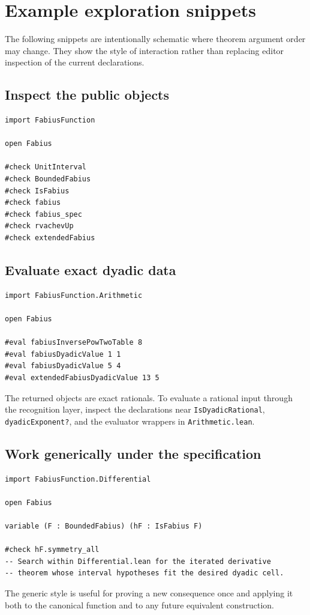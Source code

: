 \documentclass[11pt,oneside]{article}
\theoremstyle{definition}
\theoremstyle{remark}
\begin{document}
\section{Example exploration snippets}\label{app:snippets}

The following snippets are intentionally schematic where theorem argument order may change.  They show the style of interaction rather than replacing editor inspection of the current declarations.

\subsection{Inspect the public objects}
\begin{lstlisting}[style=pseudo]
import FabiusFunction

open Fabius

#check UnitInterval
#check BoundedFabius
#check IsFabius
#check fabius
#check fabius_spec
#check rvachevUp
#check extendedFabius
\end{lstlisting}

\subsection{Evaluate exact dyadic data}
\begin{lstlisting}[style=pseudo]
import FabiusFunction.Arithmetic

open Fabius

#eval fabiusInversePowTwoTable 8
#eval fabiusDyadicValue 1 1
#eval fabiusDyadicValue 5 4
#eval extendedFabiusDyadicValue 13 5
\end{lstlisting}
The returned objects are exact rationals.  To evaluate a rational input through the recognition layer, inspect the declarations near \nolinkurl{IsDyadicRational}, \nolinkurl{dyadicExponent?}, and the evaluator wrappers in \nolinkurl{Arithmetic.lean}.

\subsection{Work generically under the specification}
\begin{lstlisting}[style=pseudo]
import FabiusFunction.Differential

open Fabius

variable (F : BoundedFabius) (hF : IsFabius F)

#check hF.symmetry_all
-- Search within Differential.lean for the iterated derivative
-- theorem whose interval hypotheses fit the desired dyadic cell.
\end{lstlisting}
The generic style is useful for proving a new consequence once and applying it both to the canonical function and to any future equivalent construction.
\end{document}

